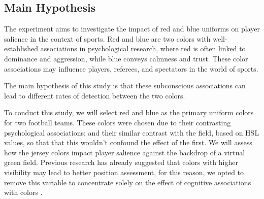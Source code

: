 
\subsection{Main Hypothesis}\label{s:overview}
 
The experiment aims to investigate the impact of red and blue uniforms on player salience in the context of sports. Red and blue are two colors with well-established associations in psychological research, where red is often linked to dominance and aggression, while blue conveys calmness and trust. These color associations may influence players, referees, and spectators in the world of sports. 

The main hypothesis of this study is that these subconscious associations can lead to different rates of detection between the two colors.

To conduct this study, we will select red and blue as the primary uniform colors for two football teams. These colors were chosen due to their contrasting psychological associations; and their similar contrast with the field, based on HSL values, so that that this wouldn't confound the effect of the first. We will assess how the jersey colors impact player salience against the backdrop of a virtual green field. Previous research has already suggested that colors with higher visibility may lead to better position assessment, for this reason, we opted to remove this variable to concentrate solely on the effect of cognitive associations with colors \cite{colors}.